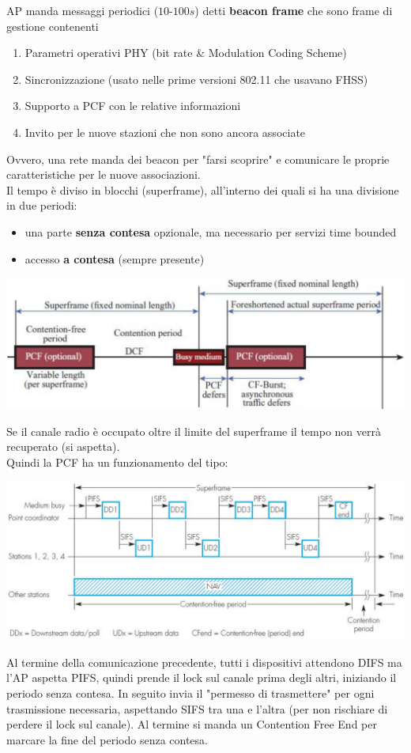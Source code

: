 AP manda messaggi periodici ($10$-$100s$) detti \textbf{beacon frame} che sono frame di gestione contenenti
\begin{enumerate}
	\item Parametri operativi PHY (bit rate \& Modulation Coding Scheme)
	\item Sincronizzazione (usato nelle prime versioni 802.11 che usavano FHSS)
	\item Supporto a PCF con le relative informazioni
	\item Invito per le nuove stazioni che non sono ancora associate
\end{enumerate}
Ovvero, una rete manda dei beacon per "farsi scoprire" e comunicare le proprie caratteristiche per le nuove associazioni.\\

Il tempo è diviso in blocchi (superframe), all'interno dei quali si ha una divisione in due periodi:
\begin{itemize}
	\item una parte \textbf{senza contesa} opzionale, ma necessario per servizi time bounded
	\item accesso \textbf{a contesa} (sempre presente)
\end{itemize}
\begin{center}
	\includegraphics[width=0.95\linewidth]{img/wlan/superframe}
\end{center}
Se il canale radio è occupato oltre il limite del superframe il tempo non verrà recuperato (si aspetta).\\

Quindi la PCF ha un funzionamento del tipo:
\begin{center}
	\includegraphics[width=0.98\linewidth]{img/wlan/pcf1}
\end{center}

Al termine della comunicazione precedente, tutti i dispositivi attendono DIFS ma l'AP aspetta PIFS, quindi prende il lock sul canale prima degli altri, iniziando il periodo senza contesa. In seguito invia il "permesso di trasmettere" per ogni trasmissione necessaria, aspettando SIFS tra una e l'altra (per non rischiare di perdere il lock sul canale). Al termine si manda un Contention Free End per marcare la fine del periodo senza contesa.\\

